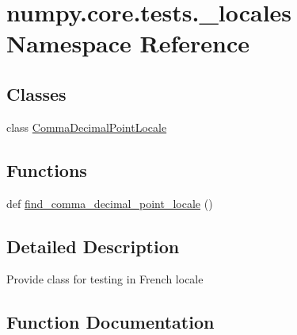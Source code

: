 \hypertarget{namespacenumpy_1_1core_1_1tests_1_1__locales}{}\section{numpy.\+core.\+tests.\+\_\+locales Namespace Reference}
\label{namespacenumpy_1_1core_1_1tests_1_1__locales}
\subsection*{Classes}
\begin{DoxyCompactItemize}
\item 
class \hyperlink{classnumpy_1_1core_1_1tests_1_1__locales_1_1CommaDecimalPointLocale}{Comma\+Decimal\+Point\+Locale}
\end{DoxyCompactItemize}
\subsection*{Functions}
\begin{DoxyCompactItemize}
\item 
def \hyperlink{namespacenumpy_1_1core_1_1tests_1_1__locales_a775927faae3811e512d32d0e85a42e37}{find\+\_\+comma\+\_\+decimal\+\_\+point\+\_\+locale} ()
\end{DoxyCompactItemize}


\subsection{Detailed Description}
\begin{DoxyVerb}Provide class for testing in French locale\end{DoxyVerb}
 

\subsection{Function Documentation}
\mbox{\label{namespacenumpy_1_1core_1_1tests_1_1__locales_a775927faae3811e512d32d0e85a42e37}} 
